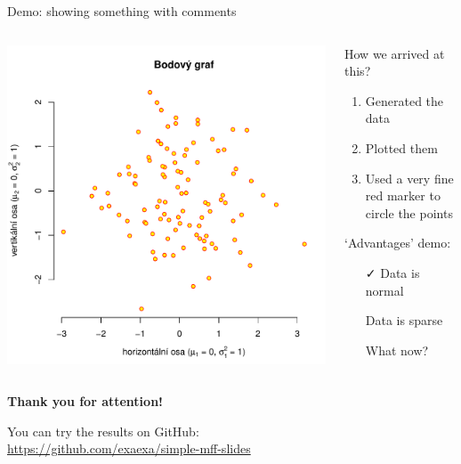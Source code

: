\documentclass[aspectratio=169]{beamer}
\begin{document}
\begin{frame}{Demo: showing something with comments}
\begin{columns}
\begin{column}{0.5\textwidth}
\includegraphics[width=\linewidth]{img/ukazka-obr01.pdf}
\end{column}
\begin{column}{0.5\textwidth}
How we arrived at this?
\begin{enumerate}
\item Generated the data
\item Plotted them
\item Used a very fine red marker to circle the points
\end{enumerate}

`Advantages' demo:

\begin{itemize}
\item[\color{green}\faCheck] Data is normal
\item[\color{red}\faTimes] Data is sparse
\item[\color{violet}\faQuestionCircle] What now?
\end{itemize}
\end{column}
\end{columns}
\end{frame}

\begin{frame}[plain]
\centering
{\Large\bfseries Thank you for attention!}

You can try the results on GitHub: \\
\url{https://github.com/exaexa/simple-mff-slides}

\end{frame}
\end{document}
